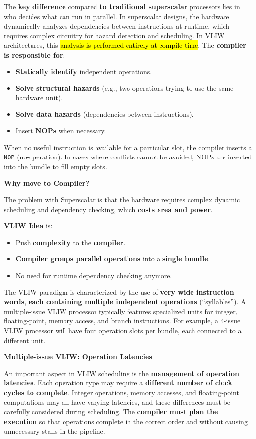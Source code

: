 \highspace
The \textbf{key difference} compared \textbf{to traditional superscalar} processors lies in who decides what can run in parallel. In superscalar designs, the hardware dynamically analyzes dependencies between instructions at runtime, which requires complex circuitry for hazard detection and scheduling. In VLIW architectures, this \hl{analysis is performed entirely at compile time}. The \textbf{compiler is responsible for}:
\begin{itemize}
    \item \textbf{Statically identify} independent operations.
    \item \textbf{Solve structural hazards} (e.g., two operations trying to use the same hardware unit).
    \item \textbf{Solve data hazards} (dependencies between instructions).
    \item Insert \textbf{NOPs} when necessary.
\end{itemize}
When no useful instruction is available for a particular slot, the compiler inserts a \texttt{NOP} (no-operation). In cases where conflicts cannot be avoided, NOPs are inserted into the bundle to fill empty slots.

\highspace
\begin{flushleft}
    \textcolor{Green3}{ \textbf{Why move to Compiler?}}
\end{flushleft}
The problem with Superscalar is that the hardware requires complex dynamic scheduling and dependency checking, which \textbf{costs area and power}.

\highspace
\textbf{VLIW Idea} is:
\begin{itemize}
    \item Push \textbf{complexity} to the \textbf{compiler}.
    \item \textbf{Compiler groups parallel operations} into a \textbf{single bundle}.
    \item No need for runtime dependency checking anymore.
\end{itemize}
The VLIW paradigm is characterized by the use of \textbf{very wide instruction words}, \textbf{each containing multiple independent operations} (``syllables''). A multiple-issue VLIW processor typically features specialized units for integer, floating-point, memory access, and branch instructions. For example, a 4-issue VLIW processor will have four operation slots per bundle, each connected to a different unit.

\highspace
\begin{flushleft}
    \textcolor{Green3}{ \textbf{Multiple-issue VLIW: Operation Latencies}}
\end{flushleft}
An important aspect in VLIW scheduling is the \textbf{management of operation latencies}. Each operation type may require a \textbf{different number of clock cycles to complete}. Integer operations, memory accesses, and floating-point computations may all have varying latencies, and these differences must be carefully considered during scheduling. The \textbf{compiler must plan the execution} so that operations complete in the correct order and without causing unnecessary stalls in the pipeline.

